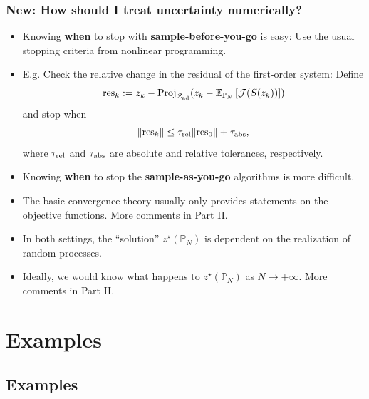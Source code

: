 \documentclass[aspectratio=169,xcolor=dvipsnames,10pt]{beamer}
\newcommand{\cJ}{\mathcal{J}}
\newcommand{\bbp}{\mathbb{P}}
\newcommand{\Zad}{\mathcal{Z}_{\text{\textup{ad}}}}
\begin{document}
\begin{frame}\frametitle{New: How should I treat uncertainty numerically?}
\begin{block}{}
\begin{itemize}
\item Knowing \textbf{when} to stop with \textbf{sample-before-you-go} is easy: Use the usual stopping criteria from nonlinear programming.
\item E.g. Check the relative change in the residual of the first-order system: Define
\[
\mathrm{res}_k := z_{k} - \mathrm{Proj}_{\Zad}(z_{k} - \mathbb E_{\bbp_{N}}\left[\cJ(S(z_{k}))\right])
\]
and stop when
\[
\| \mathrm{res}_{k} \|
\le
\tau_{\rm rel}\| \mathrm{res}_{0} \| + \tau_{\rm abs},
\]
where $\tau_{\rm rel}$ and $\tau_{\rm abs}$ are absolute and relative tolerances, respectively.
\pause
\item Knowing \textbf{when} to stop the \textbf{sample-as-you-go} algorithms is more difficult.
\item The  basic convergence theory usually only provides statements on the objective functions. More  comments in Part II. \pause
\item In \alert{both} settings, the ``solution'' $z^{\star}(\bbp_{N})$ is \alert{dependent on the realization of random processes}. 
\item Ideally, we would know what happens to $z^{\star}(\mathbb P_{N})$ as $N \to +\infty$. More comments in Part II.
\end{itemize}
\end{block} 
\end{frame}

\section{Examples}

\subsection{Examples}
\end{document}

